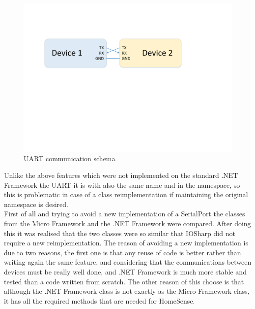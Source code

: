 \begin{figure}[H]\begin{center}
 \centering
  \captionsetup{justification=centering}
  \includegraphics[scale=0.60]{pictures/iosharp/uart-modules}
  \caption{UART communication schema\label{fig:uart-modules}}
\end{center}\end{figure}

Unlike the above features which were not implemented on the standard .NET Framework the UART it is with also the same name and in the namespace, so this is problematic in case of a class reimplementation if maintaining the original namespace is desired.
\\
First of all and trying to avoid a new implementation of a SerialPort the classes from the Micro Framework and the .NET Framework were compared. After doing this it was realised that the two classes were so similar that IOSharp did not require a new reimplementation. The reason of avoiding a new implementation is due to two reasons, the first one is that any reuse of code is better rather than writing again the same feature, and considering that the communications between devices must be really well done, and .NET Framework is much more stable and tested than a code written from scratch. The other reason of this choose is that although the .NET Framework class is not exactly as the Micro Framework class, it has all the required methods that are needed for HomeSense.


